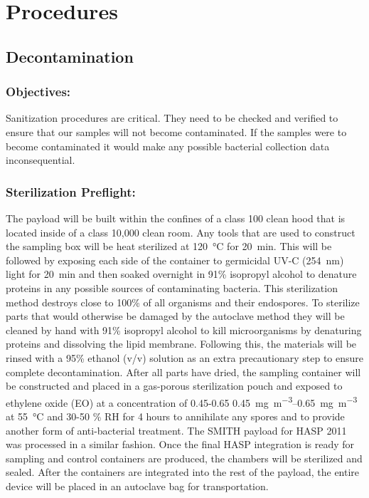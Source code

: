 \section{Procedures}
\label{sec:Procedures}

\subsection{Decontamination}
\label{subsec:Decontamination}

\subsubsection{Objectives:}
Sanitization procedures are critical. They need to be checked and verified to ensure that our samples will not become contaminated. If the samples were to become contaminated it would make any possible bacterial collection data inconsequential.

\subsubsection{Sterilization Preflight:}
The payload will be built within the confines of a class 100 clean hood that is located inside of a class 10,000 clean room. Any tools that are used to construct the sampling box will be heat sterilized at \SI{120}{\celsius} for \SI{20}{\minute}. This will be followed by exposing each side of the container to germicidal UV-C (\SI{254}{\nano\meter}) light for \SI{20}{\minute} and then soaked overnight in 91\% isopropyl alcohol to denature proteins in any possible sources of contaminating bacteria. This sterilization method destroys close to 100\% of all organisms and their endospores. To sterilize parts that would otherwise be damaged by the autoclave method they will be cleaned by hand with 91\% isopropyl alcohol to kill microorganisms by denaturing proteins and dissolving the lipid membrane. Following this, the materials will be rinsed with a 95\% ethanol (v/v) solution as an extra precautionary step to ensure complete decontamination. After all parts have dried, the sampling container will be constructed and placed in a gas-porous sterilization pouch and exposed to ethylene oxide (EO) at a concentration of 0.45-0.65 \SIrange{0.45}{0.65}{\milli\gram\per\meter\cubed} at \SI{55}{\celsius} and 30-50 \% RH for \num{4} hours to annihilate any spores and to provide another form of anti-bacterial treatment. The SMITH payload for HASP 2011 was processed in a similar fashion. Once the final HASP integration is ready for sampling and control containers are produced, the chambers will be sterilized and sealed. After the containers are integrated into the rest of the payload, the entire device will be placed in an autoclave bag for transportation.

